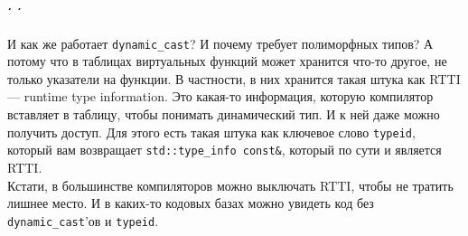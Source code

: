 \documentclass{article}
\begin{document}
    \subparagraph{. .}
    И как же работает \texttt{dynamic_cast}? И почему требует полиморфных типов? А потому что в таблицах виртуальных функций может хранится что-то другое, не только указатели на функции. В частности, в них хранится такая штука как RTTI --- runtime type information. Это какая-то информация, которую компилятор вставляет в таблицу, чтобы понимать динамический тип. И к ней даже можно получить доступ. Для этого есть такая штука как ключевое слово \texttt{typeid}, который вам возвращает \texttt{std::type_info const&}, который по сути и является RTTI.\\
    Кстати, в большинстве компиляторов можно выключать RTTI, чтобы не тратить лишнее место. И в каких-то кодовых базах можно увидеть код без \texttt{dynamic_cast}'ов и \texttt{typeid}.
\end{document}
